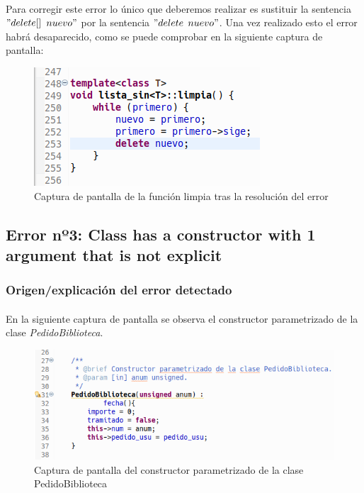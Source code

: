 			\paragraph{}Para corregir este error lo único que deberemos realizar es sustituir la sentencia $"delete[]$ $nuevo"$ por la sentencia $"delete$ $nuevo"$. Una vez realizado esto el error habrá desaparecido, como se puede comprobar en la siguiente captura de pantalla:
		
			\begin{figure}[H]
				\centering
				\includegraphics[scale=0.7]{img/captura50.png}
				\caption{Captura de pantalla de la función limpia tras la resolución del error}
				\label{captura50}
			\end{figure}
		
	\subsection{Error nº3: Class has a constructor with 1 argument that is not explicit}
	
		\subsubsection{Origen/explicación del error detectado}
	
			\paragraph{}En la siguiente captura de pantalla se observa el constructor parametrizado de la clase \textit{PedidoBiblioteca}.
			
			\begin{figure}[H]
				\centering
				\includegraphics[scale=0.7]{img/captura51.png}
				\caption{Captura de pantalla del constructor parametrizado de la clase PedidoBiblioteca}
				\label{captura51}
			\end{figure}
		
